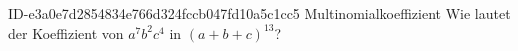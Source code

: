 \begin{exercise}
      {ID-e3a0e7d2854834e766d324fccb047fd10a5c1cc5}
      {Multinomialkoeffizient}
  \ifproblem\problem
    Wie lautet der Koeffizient von $a^{7}b^{2}c^{4}$ in $(a+b+c)^{13}$?
  \fi
\end{exercise}

